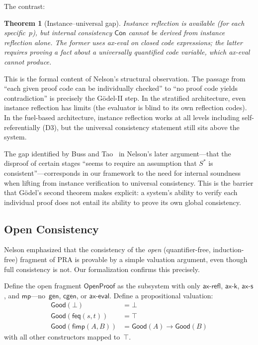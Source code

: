 \documentclass[11pt]{article}
\newtheorem{theorem}{Theorem}[section]
\newcommand{\fbot}{\bot}
\newcommand{\fimp}{\mathsf{fimp}}
\begin{document}
The contrast:

\begin{theorem}[Instance--universal gap]
Instance reflection is available (for each specific~$p$), but internal
consistency $\mathsf{Con}$ cannot be derived from instance reflection
alone. The former uses \textsf{ax-eval} on closed code expressions;
the latter requires proving a fact about a universally quantified
code variable, which \textsf{ax-eval} cannot produce.
\end{theorem}

This is the formal content of Nelson's structural observation. The
passage from ``each given proof code can be individually checked'' to
``no proof code yields contradiction'' is precisely the G\"odel-II
step. In the stratified architecture, even instance reflection has
limits (the evaluator is blind to its own reflection codes). In the
fuel-based architecture, instance reflection works at all levels
including self-referentially (D3), but the universal consistency
statement still sits above the system.

The gap identified by Buss and Tao~\cite{Nelson2015} in Nelson's
later argument---that the disproof of certain stages ``seems to
require an assumption that $S^*$ is consistent''---corresponds in our
framework to the need for internal soundness when lifting from
instance verification to universal consistency. This is the barrier
that G\"odel's second theorem makes explicit: a system's ability to
verify each individual proof does not entail its ability to prove its
own global consistency.

\subsection{Open Consistency}

Nelson emphasized that the consistency of the \emph{open} (quantifier-free,
induction-free) fragment of PRA is provable by a simple valuation argument,
even though full consistency is not. Our formalization confirms this
precisely.

Define the open fragment $\mathsf{OpenProof}$ as the subsystem with only
$\mathsf{ax\text{-}refl}$, $\mathsf{ax\text{-}k}$, $\mathsf{ax\text{-}s}$,
and $\mathsf{mp}$---no~$\mathsf{gen}$, $\mathsf{cgen}$, or
$\mathsf{ax\text{-}eval}$. Define a propositional valuation:
\begin{align*}
  \mathsf{Good}(\fbot) &= \bot \\
  \mathsf{Good}(\mathsf{feq}(s,t)) &= \top \\
  \mathsf{Good}(\fimp(A,B)) &= \mathsf{Good}(A) \to \mathsf{Good}(B)
\end{align*}
with all other constructors mapped to~$\top$.
\end{document}
